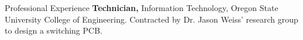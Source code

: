 \begin{rubric}{Professional Experience}
%
  \textbf{Technician,} Information Technology, Oregon State University College of Engineering.
\entry*[2022] Contracted by Dr. Jason Weiss' research group to design a switching PCB.
\end{rubric}
